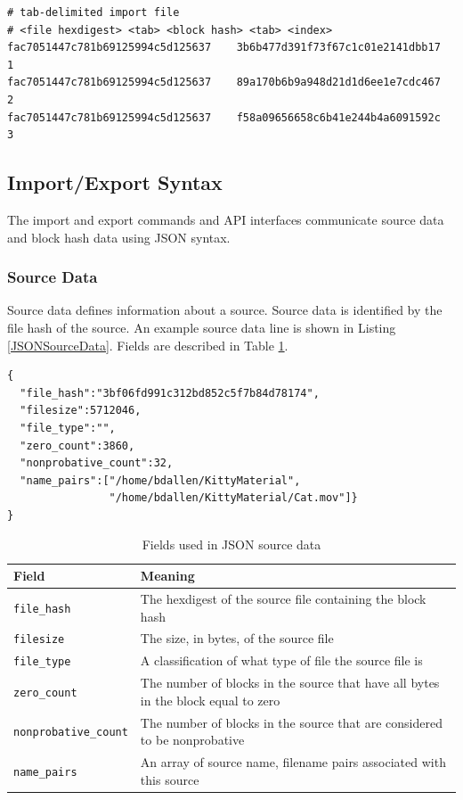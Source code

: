 \documentclass[11pt,fleqn]{article} %
\begin{document}
\lstset{style=customfile}
\begin{lstlisting}[float, caption={Example tab-delimited import file}, label=importTabFile]
# tab-delimited import file
# <file hexdigest> <tab> <block hash> <tab> <index>
fac7051447c781b69125994c5d125637    3b6b477d391f73f67c1c01e2141dbb17    1
fac7051447c781b69125994c5d125637    89a170b6b9a948d21d1d6ee1e7cdc467    2
fac7051447c781b69125994c5d125637    f58a09656658c6b41e244b4a6091592c    3
\end{lstlisting}

\subsection{Import/Export Syntax}
\label{ImportExportSyntax}
The import and export commands and API interfaces communicate source data and block hash data using JSON syntax.\\

\subsubsection{Source Data}
Source data defines information about a source. Source data is identified by the file hash of the source.  An example source data line is shown in Listing \ref{JSONSourceData}. Fields are described in Table \ref{tab:JSONSourceData}.\\

\lstset{style=customfile}
\begin{lstlisting}[float, caption={Example JSON source data used during import/export}, label=JSONSourceData]
{
  "file_hash":"3bf06fd991c312bd852c5f7b84d78174",
  "filesize":5712046,
  "file_type":"",
  "zero_count":3860,
  "nonprobative_count":32,
  "name_pairs":["/home/bdallen/KittyMaterial",
                "/home/bdallen/KittyMaterial/Cat.mov"]}
}
\end{lstlisting}

\begin{table}[!ht]

\centering
\caption{Fields used in JSON source data}
\label{tab:JSONSourceData}
\begin{tabular}{|p{5 cm}|p{8.8 cm}|}
\hline \hline
\textbf{Field} & \textbf{Meaning} \\
\hline
\verb+file_hash+ & The hexdigest of the source file containing the block hash\\
\hline
\verb+filesize+ & The size, in bytes, of the source file\\
\hline
\verb+file_type+ & A classification of what type of file the source file is\\
\hline
\verb+zero_count+ & The number of blocks in the source that have all bytes in the block equal to zero\\
\hline
\verb+nonprobative_count+ & The number of blocks in the source that are considered to be nonprobative\\
\hline
\verb+name_pairs+ & An array of source name, filename pairs associated with this source\\
\hline
\end{tabular}
\end{table}
\end{document}
